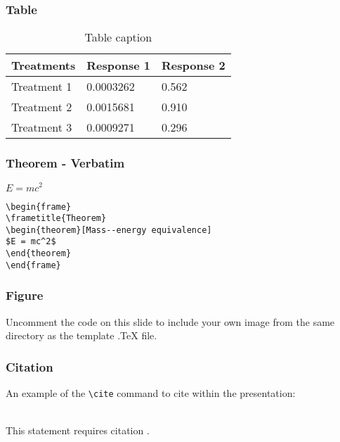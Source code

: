 \documentclass{beamer}
\begin{document}
\begin{frame}
	\frametitle{Table}
	\begin{table}
	\begin{tabular}{l l l}
	\toprule
	\textbf{Treatments} & \textbf{Response 1} & \textbf{Response 2}\\
	\midrule
	Treatment 1 & 0.0003262 & 0.562 \\
	Treatment 2 & 0.0015681 & 0.910 \\
	Treatment 3 & 0.0009271 & 0.296 \\
	\bottomrule
	\end{tabular}
	\caption{Table caption}
	\end{table}
\end{frame}


\begin{frame}[fragile] %
\frametitle{Theorem - Verbatim}

\begin{theorem}
$E = mc^2$
\end{theorem}

\begin{example}
\begin{verbatim}
\begin{frame}
\frametitle{Theorem}
\begin{theorem}[Mass--energy equivalence]
$E = mc^2$
\end{theorem}
\end{frame}\end{verbatim}
\end{example}
\end{frame}


\begin{frame}
\frametitle{Figure}
Uncomment the code on this slide to include your own image from the same directory as the template .TeX file.
\end{frame}


\begin{frame}[fragile] %
\frametitle{Citation}
An example of the \verb|\cite| command to cite within the presentation:\\~

This statement requires citation \cite{p1}.
\end{frame}
\end{document}
